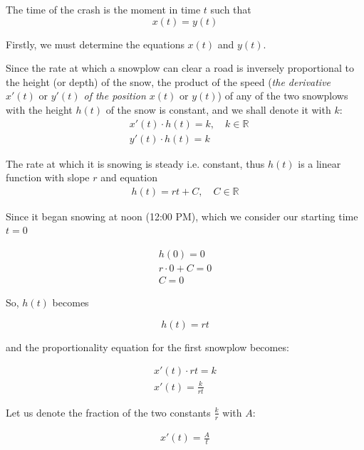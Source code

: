 \documentclass[a4paper,12pt]{article}
\renewcommand*{\textnormal}[1]{\text{ #1 }}
\begin{document}
        The time of the crash is the moment in time $t$ such that
        \[
            x(t) = y(t)
        \]

        Firstly, we must determine the equations $x(t)$ and $y(t)$.
        
        \hfill \break
        Since the rate at which a snowplow can clear a road is inversely proportional to the height (or depth) of the snow, the product of the speed (\textit{the derivative $x'(t) \textnormal{or} y'(t)$ of the position $x(t) \textnormal{or} y(t)$}) of any of the two snowplows with the height $h(t)$ of the snow is constant, and we shall denote it with $k$:
        \begin{align*}
           & x'(t) \cdot h(t) = k, \quad k \in \mathbb{R} \\
            &y'(t) \cdot h(t) = k
        \end{align*}

        The rate at which it is snowing is steady i.e. constant, thus $h(t)$ is a linear function with slope $r$ and equation
        \begin{gather*}
            h(t) = rt + C, \quad C \in \mathbb{R}
        \end{gather*}

        Since it began snowing at noon (12:00 PM), which we consider our starting time $t = 0$

        \begin{gather*}
            h(0) = 0 \\
            r \cdot 0 + C = 0 \\
            \boxed{C = 0}
        \end{gather*}

        So, $h(t)$ becomes

        \begin{equation*}
            h(t) = rt
        \end{equation*}

        and the proportionality equation for the first snowplow becomes:

        \begin{gather*}
            x'(t) \cdot rt = k \\x'(t) = \frac{k}{rt}
        \end{gather*}

        Let us denote the fraction of the two constants $\frac{k}{r}$ with $A$:

        \begin{gather*}
            x'(t) = \frac{A}{t}
        \end{gather*}
\end{document}
